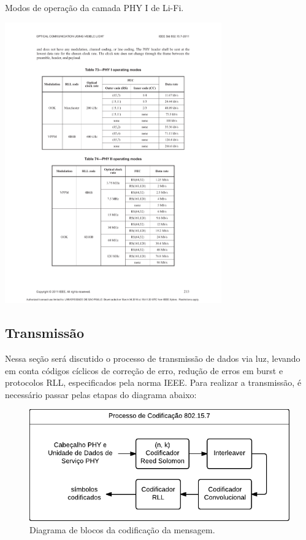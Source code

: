 	\begin{table}[h!]
		\caption{\label{tab_phy1}Modos de operação da camada PHY I de Li-Fi.}
		\centering
		\includegraphics[clip, trim=37mm 151mm 36mm 51mm,  width=0.7\textwidth]{pag213.pdf}
	\end{table}

	\subsection{Transmissão}
	
	Nessa seção será discutido o processo de transmissão de dados via luz, levando em conta códigos cíclicos de correção de erro, redução de erros em burst e protocolos RLL, especificados pela norma IEEE. Para realizar a transmissão, é necessário passar pelas etapas do diagrama abaixo:
		
		\begin{figure}[htb]
			\caption{\label{fig_transmission_phy1}Diagrama de blocos da codificação da mensagem.}
			\centering
			\includegraphics[width=0.4\textheight]{PHY1-transmission.pdf}
		\end{figure}
		
